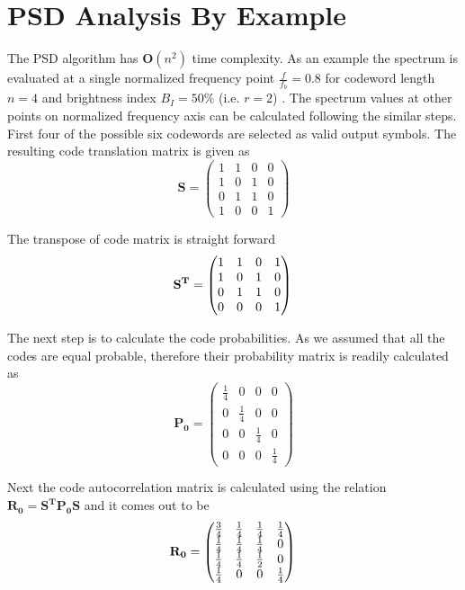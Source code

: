 \section {PSD Analysis By Example}
The PSD algorithm has $\mathbf{O}(n^2)$ time complexity. As an example the spectrum is evaluated at a single normalized frequency point $\frac{f}{f_b}=0.8$ for codeword length $n=4$ and brightness index $B_I=50\%$ (i.e. $r=2$) . The spectrum values at other points on normalized frequency axis can be calculated following the similar steps. First four of the possible six codewords are selected as valid output symbols. The resulting code translation matrix is given as
\begin{equation}
\mathbf{S}=
	\begin{pmatrix}
	     1&     1&     0&     0 \\
	     1 &    0 &    1 &    0 \\
	     0  &   1  &   1  &   0 \\
	     1   &  0   &  0   &  1
	\end{pmatrix} 
\end{equation}

The transpose of code matrix is straight forward
\begin{equation}
\mathbf{S^T}=
	\begin{pmatrix}
     1 &    1&     0&     1\\
     1  &   0 &    1 &    0\\
     0   &  1  &   1  &   0\\
     0    & 0   &  0   &  1
	\end{pmatrix} \\
\end{equation}

The next step is to calculate the code probabilities. As we assumed that all the codes are equal probable, therefore their probability matrix is readily calculated as
\begin{equation}
\mathbf{P_0}=
	\begin{pmatrix}
	     \frac{1}{4}&0&0&0 \\
	     0&\frac{1}{4}&0&0 \\
	     0&0&\frac{1}{4}&0 \\
	     0&0&0&\frac{1}{4} 
	\end{pmatrix} 
\end{equation}

Next the code autocorrelation matrix is calculated using the relation $\mathbf{R_0=S^T P_0 S }$ and it comes out to be
\begin{equation}
\mathbf{R_0}=
	\begin{pmatrix}
	     \frac{3}{4}&\frac{1}{4}&\frac{1}{4}&\frac{1}{4} \\
	     \frac{1}{4}&\frac{1}{4}&\frac{1}{4}&0 \\
	     \frac{1}{4}&\frac{1}{4}&\frac{1}{2}&0 \\
	     \frac{1}{4}& 0             & 0             &\frac{1}{4}
	\end{pmatrix} \\
\end{equation}


